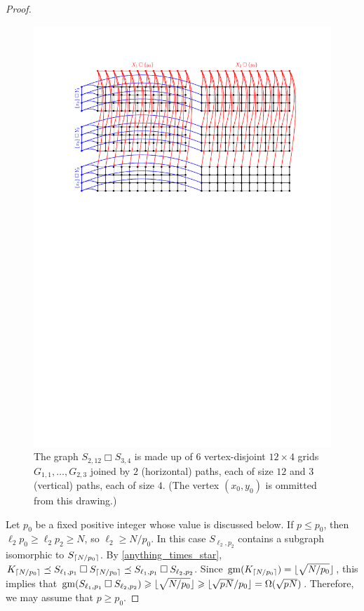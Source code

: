 \documentclass[kpfonts,lotsofwhite]{patmorin}
\newcommand{\boxprod}{\mathbin{\Box}}
\DeclarePairedDelimiter{\floor}{\lfloor}{\rfloor}
\DeclarePairedDelimiter{\ceil}{\lceil}{\rceil}
\renewcommand{\ge}{\geqslant}
\renewcommand{\le}{\leqslant}
\DeclareMathOperator{\gm}{gm}
\theoremstyle{plain}
\theoremstyle{definition}
\begin{document}
\begin{proof}
  \begin{figure}
    \begin{center}
      \includegraphics{t1xt2}
    \end{center}
    \caption{The graph $S_{2,12}\boxprod S_{3,4}$ is made up of $6$ vertex-disjoint $12\times 4$ grids $G_{1,1},\ldots,G_{2,3}$ joined by $2$ (horizontal) paths, each of size $12$ and $3$ (vertical) paths, each of size $4$.  (The vertex $(x_0,y_0)$ is ommitted from this drawing.)}
    \label{t1xt2}
  \end{figure}

  Let $p_0$ be a fixed positive integer whose value is discussed below. If $p \le p_0$, then $\ell_2 p_0 \ge \ell_2 p_2 \ge N$, so $\ell_2\ge N/p_0$.  In this case $S_{\ell_2,p_2}$ contains a subgraph isomorphic to $S_{\ceil{N/p_0}}$.  By \cref{anything_times_star}, $K_{\ceil{N/p_0}}\preceq S_{\ell_1,p_1}\boxprod S_{\ceil{N/p_0}} \preceq S_{\ell_1,p_1}\boxprod S_{\ell_2,p_2}$.  Since $\gm(K_{\ceil{N/p_0}}) = \floor{\sqrt{N/p_0}}$, this implies that $\gm(S_{\ell_1,p_1}\boxprod S_{\ell_2,p_2}) \ge \floor{\sqrt{N/p_0}}\ge \floor{\sqrt{pN}/p_0}=\Omega(\sqrt{pN})$.  Therefore, we may assume that $p\ge p_0$.


\end{proof}
\end{document}
